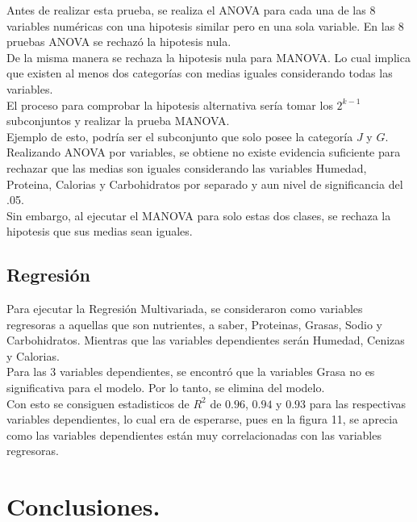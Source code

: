 \documentclass[12pt, letterpaper]{article}
\begin{document}
Antes de realizar esta prueba, se realiza el ANOVA para cada una de las 8 variables numéricas con una hipotesis similar pero en una sola variable. En las 8 pruebas ANOVA se rechazó la hipotesis nula.\\

De la misma manera se rechaza la hipotesis nula para MANOVA. Lo cual implica que existen al menos dos categorías con medias iguales considerando todas las variables.\\

El proceso para comprobar la hipotesis alternativa sería tomar los $2^{k-1}$ subconjuntos y realizar la prueba MANOVA.\\

Ejemplo de esto, podría ser el subconjunto que solo posee la categoría $J$ y $G$. Realizando ANOVA por variables, se obtiene no existe evidencia suficiente para rechazar que las medias son iguales considerando las variables Humedad, Proteina, Calorias y Carbohidratos por separado y aun nivel de significancia del .05.\\

Sin embargo, al ejecutar el MANOVA para solo estas dos clases, se rechaza la hipotesis que sus medias sean iguales.

\subsection{Regresión}
Para ejecutar la Regresión Multivariada, se consideraron como variables regresoras a aquellas que son nutrientes, a saber, Proteinas, Grasas, Sodio y Carbohidratos. Mientras que las variables dependientes serán Humedad, Cenizas y Calorias.\\

Para las 3 variables dependientes, se encontró que la variables Grasa no es significativa para el modelo. Por lo tanto, se elimina del modelo.\\

Con esto se consiguen estadisticos de $R^2$ de $0.96$, $0.94$ y $0.93$ para las respectivas variables dependientes, lo cual era de esperarse, pues en la figura 11, se aprecia como las variables dependientes están muy correlacionadas con las variables regresoras.

\section{Conclusiones.}
\end{document}
